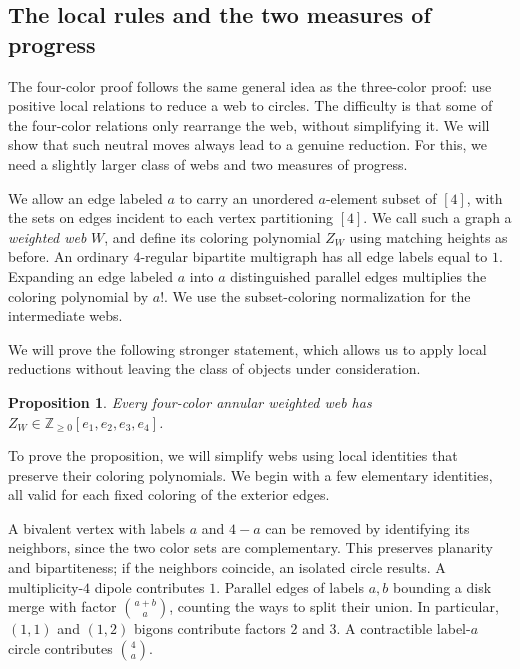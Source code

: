 \documentclass[11pt]{article}
\newtheorem{proposition}[theorem]{Proposition}
\theoremstyle{definition}
\theoremstyle{remark}
\newcommand{\NN}{\mathbb Z_{\ge0}}
\begin{document}
\subsection{The local rules and the two measures of progress}

The four-color proof follows the same general idea
as the three-color proof: use positive local relations
to reduce a web to circles. The difficulty is that
some of the four-color relations only rearrange the
web, without simplifying it. We will show that such
neutral moves always lead to a genuine reduction.
For this, we need a slightly larger class of webs
and two measures of progress.

We allow an edge labeled $a$ to carry an unordered
$a$-element subset of $[4]$, with the sets on edges
incident to each vertex partitioning $[4]$.
We call such a graph a \emph{weighted web} $W$,
and define its coloring polynomial $Z_W$ using
matching heights as before. An ordinary
$4$-regular bipartite multigraph has all edge
labels equal to $1$. Expanding an edge labeled
$a$ into $a$ distinguished parallel edges
multiplies the coloring polynomial by $a!$.
We use the subset-coloring normalization for
the intermediate webs.

We will prove the following stronger statement,
which allows us to apply local reductions without
leaving the class of objects under consideration.

\begin{proposition}\label{prop:fourcolor}
Every four-color annular weighted web has
$Z_W\in\NN[e_1,e_2,e_3,e_4]$.
\end{proposition}



To prove the proposition, we will simplify webs
using local identities that preserve their coloring
polynomials. We begin with a few elementary
identities, all valid for each fixed coloring
of the exterior edges.



A bivalent vertex with labels $a$ and $4-a$
can be removed by identifying its neighbors,
since the two color sets are complementary.
This preserves planarity and bipartiteness;
if the neighbors coincide, an isolated circle
results. A multiplicity-$4$ dipole contributes
$1$. Parallel edges of labels $a,b$ bounding
a disk merge with factor $\binom{a+b}{a}$,
counting the ways to split their union.
In particular, $(1,1)$ and $(1,2)$ bigons
contribute factors $2$ and $3$.
A contractible label-$a$ circle contributes
$\binom4a$.
\end{document}
